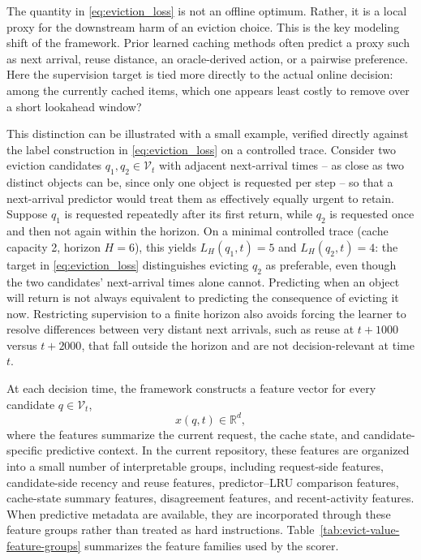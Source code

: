 \documentclass[preprint,12pt]{elsarticle}
\begin{document}
The quantity in \eqref{eq:eviction_loss} is not an offline optimum. Rather, it is a local proxy for the downstream harm of an eviction choice. This is the key modeling shift of the framework. Prior learned caching methods often predict a proxy such as next arrival, reuse distance, an oracle-derived action, or a pairwise preference. Here the supervision target is tied more directly to the actual online decision: among the currently cached items, which one appears least costly to remove over a short lookahead window?

This distinction can be illustrated with a small example, verified directly against the label construction in \eqref{eq:eviction_loss} on a controlled trace. Consider two eviction candidates $q_1, q_2 \in \mathcal{V}_t$ with adjacent next-arrival times -- as close as two distinct objects can be, since only one object is requested per step -- so that a next-arrival predictor would treat them as effectively equally urgent to retain. Suppose $q_1$ is requested repeatedly after its first return, while $q_2$ is requested once and then not again within the horizon. On a minimal controlled trace (cache capacity 2, horizon $H=6$), this yields $L_H(q_1,t) = 5$ and $L_H(q_2,t) = 4$: the target in \eqref{eq:eviction_loss} distinguishes evicting $q_2$ as preferable, even though the two candidates' next-arrival times alone cannot. Predicting when an object will return is not always equivalent to predicting the consequence of evicting it now. Restricting supervision to a finite horizon also avoids forcing the learner to resolve differences between very distant next arrivals, such as reuse at $t{+}1000$ versus $t{+}2000$, that fall outside the horizon and are not decision-relevant at time $t$.

At each decision time, the framework constructs a feature vector for every candidate $q \in \mathcal{V}_t$,
\begin{equation}
x(q,t) \in \mathbb{R}^{d},
\label{eq:feature_vector}
\end{equation}
where the features summarize the current request, the cache state, and candidate-specific predictive context. In the current repository, these features are organized into a small number of interpretable groups, including request-side features, candidate-side recency and reuse features, predictor--LRU comparison features, cache-state summary features, disagreement features, and recent-activity features. When predictive metadata are available, they are incorporated through these feature groups rather than treated as hard instructions. Table~\ref{tab:evict-value-feature-groups} summarizes the feature families used by the scorer.
\end{document}
